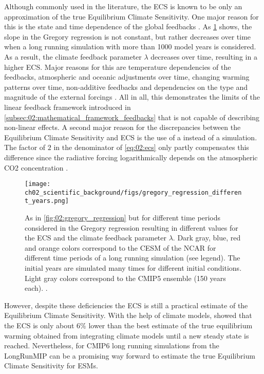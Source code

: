 Although commonly used in the literature, the \ac{ECS} is known to be only an
approximation of the true Equilibrium Climate Sensitivity. One major reason for
this is the state and time dependence of the global feedbacks
\autocite{Knutti2015, Knutti2017}. As
\cref{fig:02:gregory_regression_different_years} shows, the slope in the
Gregory regression is not constant, but rather decreases over time when a long
running  simulation with more than 1000 model years is considered.
As a result, the climate feedback parameter $\lambda$ decreases over time,
resulting in a higher \ac{ECS}. Major reasons for this are temperature
dependencies of the feedbacks, atmospheric and oceanic adjustments over time,
changing warming patterns over time, non-additive feedbacks and dependencies on
the type and magnitude of the external forcings \autocite{Knutti2017}. All in
all, this demonstrates the limits of the linear feedback framework introduced
in \cref{subsec:02:mathematical_framework_feedbacks} that is not capable of
describing non-linear effects. A second major reason for the discrepancies
between the Equilibrium Climate Sensitivity and \ac{ECS} is the use of a
 instead of a  simulation. The factor of $2$ in the
denominator of \cref{eq:02:ecs} only partly compensates this difference since
the radiative forcing logarithmically depends on the atmospheric \ac{CO2}
concentration \autocite{Huang2014}.

\begin{figure}[t]
  \centering
  \texttt{[image: 
    ch02\_scientific\_background/figs/gregory\_regression\_different\_years.png]}
  \caption{As in \cref{fig:02:gregory_regression} but for different time
    periods considered in the Gregory regression resulting in different values
    for the \acf{ECS} and the climate feedback parameter $\lambda$. Dark gray,
    blue, red and orange colors correspond to the \acf{CESM} of the \acf{NCAR}
    for different time periods of a long running simulation (see legend). The
    initial years are simulated many times for different initial conditions.
    Light gray colors correspond to the \acs{CMIP}5 ensemble (150 years each).
    .}
  \label{fig:02:gregory_regression_different_years}
\end{figure}

However, despite these deficiencies the \ac{ECS} is still a practical estimate
of the Equilibrium Climate Sensitivity. With the help of climate models,
\textcite{Sherwood2020} showed that the \ac{ECS} is only about $6 \unit{\%}$
lower than the best estimate of the true equilibrium warming obtained from
integrating climate models until a new steady state is reached. Nevertheless,
for \acs{CMIP}6 long running simulations from the \ac{LongRunMIP}
\autocite{Rugenstein2019} can be a promising way forward to estimate the true
Equilibrium Climate Sensitivity for \acp{ESM}.


